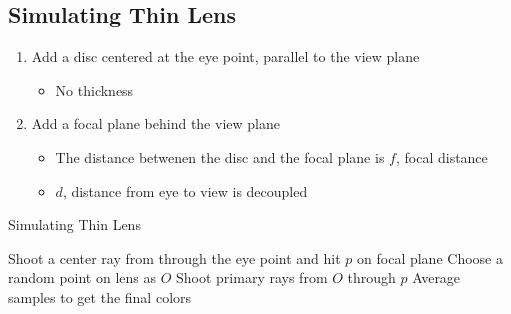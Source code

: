   \subsection{Simulating Thin Lens}

    \begin{enumerate}
      \item Add a disc centered at the eye point, parallel to the view plane
      \begin{itemize}
        \item No thickness
      \end{itemize}

      \item Add a focal plane behind the view plane
      \begin{itemize}
        \item The distance betwenen the disc and the \gls{focal plane} is $ f $,
        focal distance
        \item $ d $, distance from eye to view is decoupled
      \end{itemize}
    \end{enumerate}

    \begin{algorithm}
      \caption{Simulating Thin Lens}
       {
        Shoot a center ray from through the eye point and hit $ p $ on
        focal plane\;
        Choose a random point on lens as $ O $\;
        Shoot primary rays from $ O $ through $ p $\;
        Average samples to get the final colors\;
      }
    \end{algorithm}

